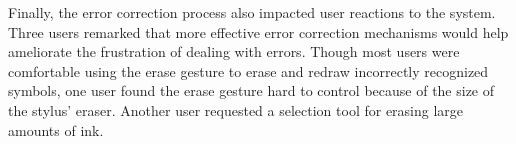\documentclass{egpubl}
\begin{document}
Finally, the error correction process also impacted user reactions to
the system.  Three users remarked that more effective error correction
mechanisms would help ameliorate the frustration of dealing with
errors.  Though most users were comfortable using the erase gesture to
erase and redraw incorrectly recognized symbols, one user found the
erase gesture hard to control because of the size of the stylus'
eraser.  Another user requested a selection tool for erasing large
amounts of ink.

  




\end{document}
